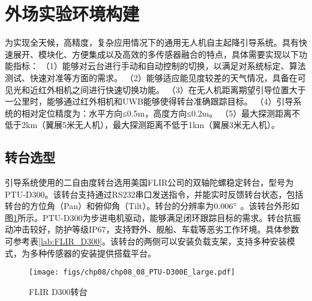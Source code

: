 \section{外场实验环境构建}
为实现全天候，高精度，复杂应用情况下的通用无人机自主起降引导系统。具有快速展开、模块化、方便集成以及高效的多传感器融合的特点，具体需要实现以下功能指标：
（1）能够对云台进行手动和自动控制的切换，以满足对系统标定、算法测试、快速对准等方面的需求。
（2）能够适应能见度较差的天气情况，具备在可见光和近红外相机之间进行快速切换功能。
（3）在无人机距离期望引导位置大于一公里时，能够通过红外相机和UWB能够使得转台准确跟踪目标。
（4）引导系统的相对定位精度为：水平方向≤0.5m，高度方向≤0.2m。
（5）最大探测距离不低于2km（翼展5米无人机），最大探测距离不低于1km（翼展3米无人机）。

\subsection{转台选型}
引导系统使用的二自由度转台选用美国FLIR公司的双轴陀螺稳定转台，型号为PTU-D300。该转台支持通过RS232串口发送指令，并能实时反馈转台状态，包括转台的方位角（Pan）和俯仰角（Tilt）。转台的分辨率为$0.006\degree$ 。该转台外形如图\ref{fig:chp08_08_PTU-D300E_large}所示。PTU-D300为步进电机驱动，能够满足闭环跟踪目标的需求。转台抗振动冲击较好，防护等级IP67，支持野外、舰船、车载等恶劣工作环境。具体参数可参考表\ref{lab:FLIR_D300}。该转台的两侧可以安装负载支架，支持多种安装模式，为多种传感器的安装提供搭载平台。
\begin{figure}[!ht]
	\centering
	\texttt{[image: figs/chp08/chp08\_08\_PTU-D300E\_large.pdf]}	
	\caption{FLIR D300转台}
	\label{fig:chp08_08_PTU-D300E_large}
\end{figure}
